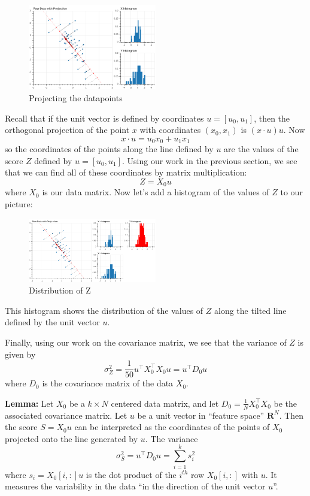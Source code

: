 \documentclass[]{article}
\begin{document}
\begin{figure}
\hypertarget{fig:pcasimfig-2}{%
\centering
\includegraphics[width=0.5\textwidth,height=\textheight]{../img/PCAsimulated-3.png}
\caption{Projecting the datapoints}\label{fig:pcasimfig-2}
}
\end{figure}

Recall that if the unit vector is defined by coordinates
\(u=[u_0,u_1]\), then the orthogonal projection of the point \(x\) with
coordinates \((x_0,x_1)\) is \((x\cdot u)u\). Now \[
x\cdot u = u_0 x_0 + u_1 x_1
\] so the coordinates of the points along the line defined by \(u\) are
the values of the score \(Z\) defined by \(u=[u_0,u_1]\). Using our work
in the previous section, we see that we can find all of these
coordinates by matrix multiplication: \[
Z = X_0 u
\] where \(X_0\) is our data matrix. Now let's add a histogram of the
values of \(Z\) to our picture:

\begin{figure}
\hypertarget{fig:pcasimfig-3}{%
\centering
\includegraphics[width=0.5\textwidth,height=\textheight]{../img/PCAsimulated-4.png}
\caption{Distribution of Z}\label{fig:pcasimfig-3}
}
\end{figure}

This histogram shows the distribution of the values of \(Z\) along the
tilted line defined by the unit vector \(u\).

Finally, using our work on the covariance matrix, we see that the
variance of \(Z\) is given by \[
\sigma_{Z}^2 = \frac{1}{50}u^{\intercal}X_{0}^{\intercal}X_{0}u = u^{\intercal}D_{0}u
\] where \(D_{0}\) is the covariance matrix of the data \(X_{0}\).

\textbf{Lemma:} Let \(X_{0}\) be a \(k\times N\) centered data matrix,
and let \(D_{0}=\frac{1}{N}X_{0}^{\intercal}X_{0}\) be the associated
covariance matrix. Let \(u\) be a unit vector in ``feature space''
\(\mathbf{R}^{N}\). Then the score \(S=X_{0}u\) can be interpreted as
the coordinates of the points of \(X_{0}\) projected onto the line
generated by \(u\). The variance \[
\sigma^{2}_{S} = u^{\intercal}D_{0}u = \sum_{i=1}^{k} s_{i}^2
\] where \(s_{i} = X_{0}[i,:]u\) is the dot product of the \(i^{th}\)
row \(X_{0}[i,:]\) with \(u\). It measures the variability in the data
``in the direction of the unit vector \(u\)''.
\end{document}
